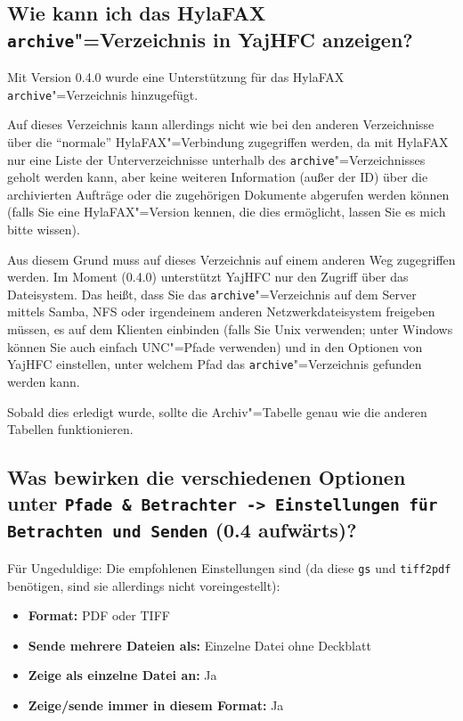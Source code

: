 \documentclass[a4paper,10pt,halfparskip,noparindent]{scrartcl}
\begin{document}
\subsection{Wie kann ich das HylaFAX \texttt{archive}"=Verzeichnis in YajHFC anzeigen?}

Mit Version 0.4.0 wurde eine Unterstützung für das HylaFAX \texttt{archive}"=Verzeichnis hinzugefügt.

Auf dieses Verzeichnis kann allerdings nicht wie bei den anderen Verzeichnisse über die "`normale"' HylaFAX"=Verbindung zugegriffen werden, da mit HylaFAX nur eine Liste der Unterverzeichnisse unterhalb des \texttt{archive}"=Verzeichnisses geholt werden kann, aber keine weiteren Information (außer der ID) über die archivierten Aufträge oder die zugehörigen Dokumente abgerufen werden können (falls Sie eine HylaFAX"=Version kennen, die dies ermöglicht, lassen Sie es mich bitte wissen).

Aus diesem Grund muss auf dieses Verzeichnis auf einem anderen Weg zugegriffen werden.
Im Moment (0.4.0) unterstützt YajHFC nur den Zugriff über das Dateisystem. Das heißt, dass Sie das \texttt{archive}"=Verzeichnis auf dem Server mittels Samba, NFS oder irgendeinem anderen Netzwerkdateisystem freigeben müssen, es auf dem Klienten einbinden (falls Sie Unix verwenden; unter Windows können Sie auch einfach UNC"=Pfade verwenden) und in den Optionen von YajHFC einstellen, unter welchem Pfad das \texttt{archive}"=Verzeichnis gefunden werden kann.

Sobald dies erledigt wurde, sollte die Archiv"=Tabelle genau wie die anderen Tabellen funktionieren.


\subsection{Was bewirken die verschiedenen Optionen unter \texttt{Pfade \& Betrachter -> Einstellungen für Betrachten und Senden} (0.4 aufwärts)?}

Für Ungeduldige: Die empfohlenen Einstellungen sind (da diese \texttt{gs} und \texttt{tiff2pdf} benötigen, sind sie allerdings nicht voreingestellt):
\begin{itemize}
 \item \textbf{Format:} PDF oder TIFF
 \item \textbf{Sende mehrere Dateien als:} Einzelne Datei ohne Deckblatt
 \item \textbf{Zeige als einzelne Datei an:} Ja
 \item \textbf{Zeige/sende immer in diesem Format:} Ja
\end{itemize}
\end{document}
